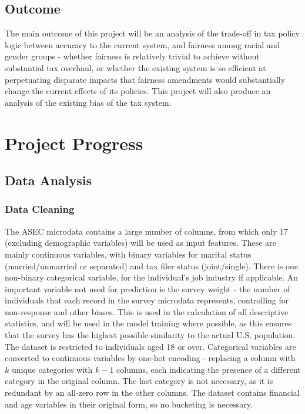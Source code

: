 \documentclass[conference]{IEEEtran}
\begin{document}
\subsection{Outcome}
The main outcome of this project will be an analysis of the trade-off in tax policy logic between accuracy to the current system, and fairness among racial and gender groups - whether fairness is relatively trivial to achieve without substantial tax overhaul, or whether the existing system is so efficient at perpetuating disparate impacts that fairness amendments would substantially change the current effects of its policies. This project will also produce an analysis of the existing bias of the tax system.

\section{Project Progress}
\subsection{Data Analysis}
\subsubsection{Data Cleaning}
The ASEC microdata contains a large number of columns, from which only 17 (excluding demographic variables) will be used as input features. These are mainly continuous variables, with binary variables for marital status (married/unmarried or separated) and tax filer status (joint/single). There is one non-binary categorical variable, for the individual's job industry if applicable. An important variable not used for prediction is the survey weight - the number of individuals that each record in the survey microdata represents, controlling for non-response and other biases. This is used in the calculation of all descriptive statistics, and will be used in the model training where possible, as this ensures that the survey has the highest possible similarity to the actual U.S. population. The dataset is restricted to individuals aged 18 or over. Categorical variables are converted to continuous variables by one-hot encoding - replacing a column with $k$ unique categories with $k-1$ columns, each indicating the presence of a different category in the original column. The last category is not necessary, as it is redundant by an all-zero row in the other columns. The dataset contains financial and age variables in their original form, so no bucketing is necessary.
\end{document}
